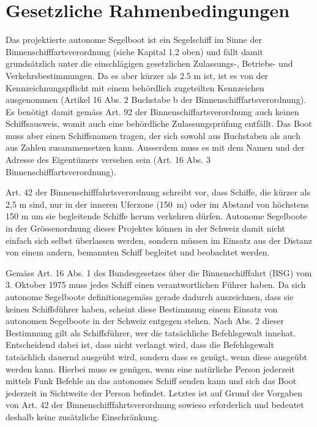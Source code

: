 \section{Gesetzliche Rahmenbedingungen}

Das projektierte autonome Segelboot ist ein Segelschiff im Sinne der Binnenschifffartsverordnung (siehe Kapital 1.2 oben) und fällt damit grundsätzlich unter die einschlägigen gesetzlichen Zulassungs-, Betriebs- und Verkehrsbestimmungen. Da es aber kürzer als 2.5 m ist, ist es von der Kennzeichnungspflicht mit einem behördlich zugeteilten Kennzeichen ausgenommen (Artikel 16 Abs. 2 Buchstabe b der Binnenschifffartsverordnung). Es benötigt damit gemäss Art. 92 der Binnenschiffartsverordnung auch keinen Schiffsausweis, womit auch eine behördliche Zulassungsprüfung entfällt. Das Boot muss aber einen Schiffsnamen tragen, der sich sowohl aus Buchstaben als auch aus Zahlen zusammensetzen kann. Ausserdem muss es mit dem Namen und der Adresse des Eigentümers versehen sein (Art. 16 Abs. 3 Binnenschifffartsverordnung). 

Art. 42 der Binnenschifffahrtsverordnung schreibt vor, dass Schiffe, die kürzer als 2,5 m sind, nur in der inneren Uferzone (150 m) oder im Abstand von höchstens 150 m um sie begleitende Schiffe herum verkehren dürfen. Autonome Segelboote in der Grössenordnung dieses Projektes können in der Schweiz damit nicht einfach sich selbst überlassen werden, sondern müssen im Einsatz aus der Distanz von einem andern, bemannten Schiff  begleitet und beobachtet werden.  

Gemäss Art. 16 Abs. 1 des Bundesgesetzes über die Binnenschifffahrt (BSG) vom 3. Oktober 1975 muss jedes Schiff einen verantwortlichen Führer haben. Da sich autonome Segelboote definitionsgemäss gerade dadurch auszeichnen, dass sie keinen Schiffsführer haben, scheint diese Bestimmung einem Einsatz von autonomen Segelboote in der Schweiz entgegen stehen. Nach Abs. 2 dieser Bestimmung gilt als Schiffsführer, wer die tatsächliche Befehlsgewalt innehat. Entscheidend dabei ist, dass nicht verlangt wird, dass die Befehlsgewalt tatsächlich dauernd ausgeübt wird, sondern dass es genügt, wenn diese ausgeübt werden kann. Hierbei muss es genügen, wenn eine natürliche Person jederzeit mittels Funk Befehle an das autonomes Schiff senden kann und sich das Boot jederzeit in Sichtweite der Person befindet. Letztes ist auf Grund der Vorgaben von Art. 42 der Binnenschifffahrtsverordnung sowieso erforderlich und bedeutet deshalb keine zusätzliche Einschränkung.

